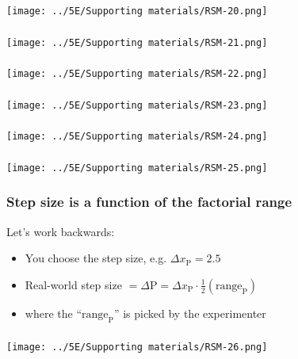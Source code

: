 \begin{frame}\frametitle{}
	\centerline{\texttt{[image: ../5E/Supporting materials/RSM-20.png]}}
\end{frame}
\begin{frame}\frametitle{}
	\centerline{\texttt{[image: ../5E/Supporting materials/RSM-21.png]}}
\end{frame}
\begin{frame}\frametitle{}
	\centerline{\texttt{[image: ../5E/Supporting materials/RSM-22.png]}}
\end{frame}
\begin{frame}\frametitle{}
	\centerline{\texttt{[image: ../5E/Supporting materials/RSM-23.png]}}
\end{frame}
\begin{frame}\frametitle{}
	\centerline{\texttt{[image: ../5E/Supporting materials/RSM-24.png]}}
\end{frame}
\begin{frame}\frametitle{}
	\centerline{\texttt{[image: ../5E/Supporting materials/RSM-25.png]}}
\end{frame}

\begin{frame}\frametitle{Step size is a function of the factorial range}
	Let's work backwards:\vspace{1cm}
	\begin{itemize}
		\item	You choose the step size, e.g. $\Delta x_\text{P} = 2.5$
		\vspace{0.5cm}
		\item	Real-world step size $= \Delta \text{P} = \Delta x_\text{P} \cdot \tfrac{1}{2}\left(\text{range}_\text{P} \right) $
		\vspace{0.5cm}
		\item	where the ``$\text{range}_\text{P}$'' is picked by the experimenter 
	\end{itemize}
\end{frame}

\begin{frame}\frametitle{}
	\centerline{\texttt{[image: ../5E/Supporting materials/RSM-26.png]}}
\end{frame}

